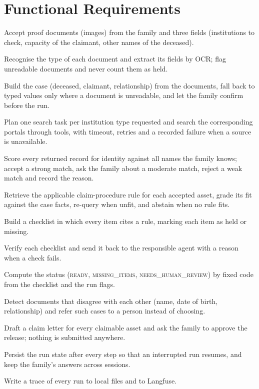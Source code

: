 \section{Functional Requirements}
\begin{description}[leftmargin=1.2cm,labelwidth=1.1cm,itemsep=2pt]
\item[FR1] Accept proof documents (images) from the family and three fields (institutions to check, capacity of the claimant, other names of the deceased).
\item[FR2] Recognise the type of each document and extract its fields by OCR; flag unreadable documents and never count them as held.
\item[FR3] Build the case (deceased, claimant, relationship) from the documents, fall back to typed values only where a document is unreadable, and let the family confirm before the run.
\item[FR4] Plan one search task per institution type requested and search the corresponding portals through tools, with timeout, retries and a recorded failure when a source is unavailable.
\item[FR5] Score every returned record for identity against all names the family knows; accept a strong match, ask the family about a moderate match, reject a weak match and record the reason.
\item[FR6] Retrieve the applicable claim-procedure rule for each accepted asset, grade its fit against the case facts, re-query when unfit, and abstain when no rule fits.
\item[FR7] Build a checklist in which every item cites a rule, marking each item as held or missing.
\item[FR8] Verify each checklist and send it back to the responsible agent with a reason when a check fails.
\item[FR9] Compute the status (\textsc{ready}, \textsc{missing\_items}, \textsc{needs\_human\_review}) by fixed code from the checklist and the run flags.
\item[FR10] Detect documents that disagree with each other (name, date of birth, relationship) and refer such cases to a person instead of choosing.
\item[FR11] Draft a claim letter for every claimable asset and ask the family to approve the release; nothing is submitted anywhere.
\item[FR12] Persist the run state after every step so that an interrupted run resumes, and keep the family's answers across sessions.
\item[FR13] Write a trace of every run to local files and to Langfuse.
\end{description}

